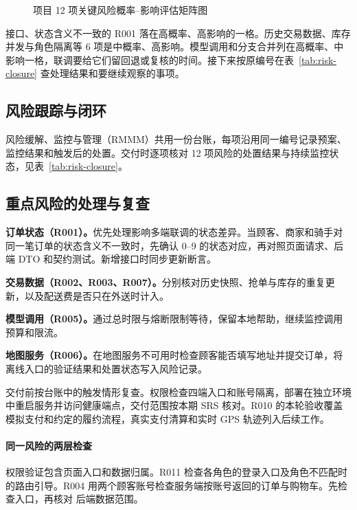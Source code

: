\begin{figure}[H]
  \centering
  \resizebox{.88\linewidth}{!}{}
  \caption{项目 12 项关键风险概率--影响评估矩阵图}\label{fig:risk-heatmap}
\end{figure}

接口、状态含义不一致的 R001 落在高概率、高影响的一格。历史交易数据、库存并发与角色隔离等 6 项是中概率、高影响。模型调用和分支合并列在高概率、中影响一格，联调要给它们留回退或复核的时间。接下来按原编号在表~\ref{tab:risk-closure} 查处理结果和要继续观察的事项。

\subsection{风险跟踪与闭环}

风险缓解、监控与管理（RMMM）共用一份台账，每项沿用同一编号记录预案、监控结果和触发后的处置。交付时逐项核对 12 项风险的处置结果与持续监控状态，见表~\ref{tab:risk-closure}。

\Needspace{.56\textheight}
\subsection{重点风险的处理与复查}

\begin{reportpoints}
\item \textbf{订单状态（R001）。}优先处理影响多端联调的状态差异。当顾客、商家和骑手对同一笔订单的状态含义不一致时，先确认 0--9 的状态对应，再对照页面请求、后端 DTO 和契约测试。新增接口时同步更新断言。
\item \textbf{交易数据（R002、R003、R007）。}分别核对历史快照、抢单与库存的重复更新，以及配送费是否只在外送时计入。
\item \textbf{模型调用（R005）。}通过总时限与熔断限制等待，保留本地帮助，继续监控调用预算和限流。
\item \textbf{地图服务（R006）。}在地图服务不可用时检查顾客能否填写地址并提交订单，将离线入口的验证结果和处置状态写入风险记录。
\end{reportpoints}

交付前按台账中的触发情形复查。权限检查四端入口和账号隔离，部署在独立环境中重启服务并访问健康端点，交付范围按本期 SRS 核对。R010 的本轮验收覆盖模拟支付和约定的履约流程，真实支付清算和实时 GPS 轨迹列入后续工作。

\paragraph{同一风险的两层检查}
权限验证包含页面入口和数据归属。R011 检查各角色的登录入口及角色不匹配时的路由引导。R004 用两个顾客账号检查服务端按账号返回的订单与购物车。先检查入口，再核对 \mbox{后端数据范围}。


